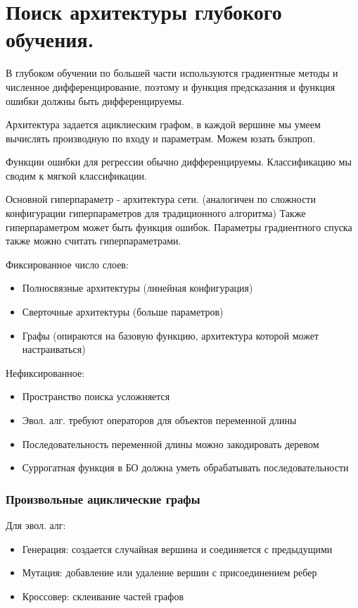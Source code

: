 \section{Поиск архитектуры глубокого обучения.}

В глубоком обучении по большей части используются градиентные
методы и численное дифференцирование, поэтому и функция
предсказания и функция ошибки должны быть дифференцируемы.

Архитектура задается ациклиеским графом, в каждой вершине мы
умеем вычислять производную по входу и параметрам. Можем юзать
бэкпроп.

Функции ошибки для регрессии обычно дифференцируемы. Классификацию
мы сводим к мягкой классификации.

Основной гиперпараметр - архитектура сети. (аналогичен по сложности
конфигурации гиперпараметров для традиционного алгоритма) Также
гиперпараметром может быть функция ошибок. Параметры градиентного
спуска также можно считать гиперпараметрами.

Фиксированное число слоев:
\begin{itemize}
    \item Полносвязные архитектуры (линейная конфигурация)
    \item Сверточные архитектуры (больше параметров)
    \item Графы (опираются на базовую функцию, архитектура
    которой может настраиваться)
\end{itemize}

Нефиксированное:
\begin{itemize}
    \item Пространство поиска усложняется
    \item Эвол. алг. требуют операторов для объектов переменной длины
    \item Последовательность переменной длины можно закодировать деревом
    \item Суррогатная функция в БО должна уметь обрабатывать последовательности
\end{itemize}

\subsubsection*{Произвольные ациклические графы}

Для эвол. алг:
\begin{itemize}
    \item Генерация: создается случайная вершина и соединяется с
    предыдущими
    \item Мутация: добавление или удаление вершин с присоединением ребер
    \item Кроссовер: склеивание частей графов
\end{itemize}

